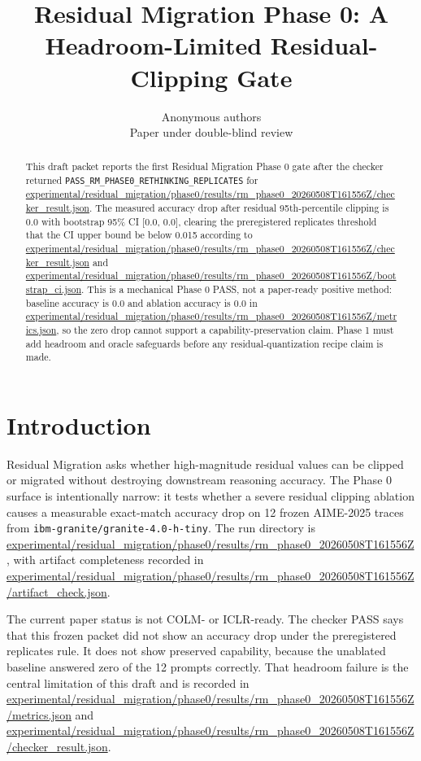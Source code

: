 \documentclass{article}
\title{Residual Migration Phase 0: A Headroom-Limited Residual-Clipping Gate}
\author{Anonymous authors\\Paper under double-blind review}
\begin{document}
\maketitle

\begin{abstract}
This draft packet reports the first Residual Migration Phase 0 gate after the
checker returned
\texttt{PASS\_RM\_PHASE0\_RETHINKING\_REPLICATES} for
\url{experimental/residual_migration/phase0/results/rm_phase0_20260508T161556Z/checker_result.json}.
The measured accuracy drop after residual 95th-percentile clipping is 0.0 with
bootstrap 95\% CI [0.0, 0.0], clearing the preregistered replicates threshold
that the CI upper bound be below 0.015 according to
\url{experimental/residual_migration/phase0/results/rm_phase0_20260508T161556Z/checker_result.json}
and
\url{experimental/residual_migration/phase0/results/rm_phase0_20260508T161556Z/bootstrap_ci.json}.
This is a mechanical Phase 0 PASS, not a paper-ready positive method:
baseline accuracy is 0.0 and ablation accuracy is 0.0 in
\url{experimental/residual_migration/phase0/results/rm_phase0_20260508T161556Z/metrics.json},
so the zero drop cannot support a capability-preservation claim. Phase 1 must
add headroom and oracle safeguards before any residual-quantization recipe
claim is made.
\end{abstract}

\section{Introduction}

Residual Migration asks whether high-magnitude residual values can be clipped
or migrated without destroying downstream reasoning accuracy. The Phase 0
surface is intentionally narrow: it tests whether a severe residual clipping
ablation causes a measurable exact-match accuracy drop on 12 frozen AIME-2025
traces from \texttt{ibm-granite/granite-4.0-h-tiny}. The run directory is
\url{experimental/residual_migration/phase0/results/rm_phase0_20260508T161556Z},
with artifact completeness recorded in
\url{experimental/residual_migration/phase0/results/rm_phase0_20260508T161556Z/artifact_check.json}.

The current paper status is not COLM- or ICLR-ready. The checker PASS says
that this frozen packet did not show an accuracy drop under the preregistered
replicates rule. It does not show preserved capability, because the unablated
baseline answered zero of the 12 prompts correctly. That headroom failure is
the central limitation of this draft and is recorded in
\url{experimental/residual_migration/phase0/results/rm_phase0_20260508T161556Z/metrics.json}
and
\url{experimental/residual_migration/phase0/results/rm_phase0_20260508T161556Z/checker_result.json}.
\end{document}
